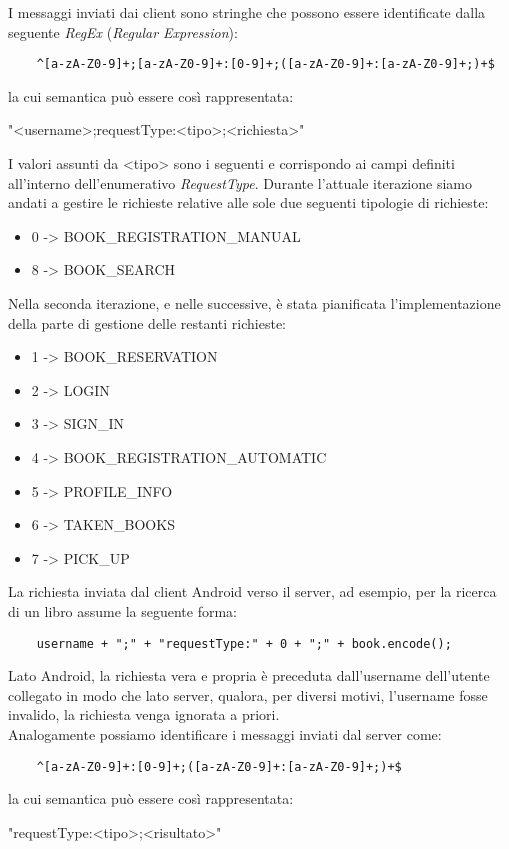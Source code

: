 I messaggi inviati dai client sono stringhe che possono essere identificate dalla seguente \textit{RegEx} (\textit{Regular Expression}): 
\begin{center}
	\begin{lstlisting}
	^[a-zA-Z0-9]+;[a-zA-Z0-9]+:[0-9]+;([a-zA-Z0-9]+:[a-zA-Z0-9]+;)+$
	\end{lstlisting}
\end{center}
la cui semantica può essere così rappresentata:
\begin{center}
"<username>;requestType:<tipo>;<richiesta>"
\end{center}
I valori assunti da <tipo> sono i seguenti e corrispondo ai campi definiti all'interno dell'enumerativo \textit{RequestType}.
Durante l'attuale iterazione siamo andati a gestire le richieste relative alle sole due seguenti tipologie di richieste:
\begin{itemize}
	\item 0 -> BOOK\_REGISTRATION\_MANUAL
	\item 8 -> BOOK\_SEARCH
\end{itemize}

Nella seconda iterazione, e nelle successive, è stata pianificata l'implementazione della parte di gestione delle restanti richieste:

\begin{itemize}
	\item 1 -> BOOK\_RESERVATION	
	\item 2 -> LOGIN
	\item 3 -> SIGN\_IN
	\item 4 -> BOOK\_REGISTRATION\_AUTOMATIC
	\item 5 -> PROFILE\_INFO
	\item 6 -> TAKEN\_BOOKS
	\item 7 -> PICK\_UP	
\end{itemize}
La richiesta inviata dal client Android verso il server, ad esempio, per la ricerca di un libro assume la seguente forma:
\begin{center}
	\begin{lstlisting}
	username + ";" + "requestType:" + 0 + ";" + book.encode();
	\end{lstlisting}
\end{center}
\noindent Lato Android, la richiesta vera e propria è preceduta dall'username dell'utente collegato in modo che lato server, qualora, per diversi motivi, l'username fosse invalido, la richiesta venga ignorata a priori.
\\ \noindent
Analogamente possiamo identificare i messaggi inviati dal server come:
\begin{center}
	\begin{lstlisting}
	^[a-zA-Z0-9]+:[0-9]+;([a-zA-Z0-9]+:[a-zA-Z0-9]+;)+$
	\end{lstlisting}
\end{center}
la cui semantica può essere così rappresentata:
\begin{center}
	"requestType:<tipo>;<risultato>"
\end{center}

